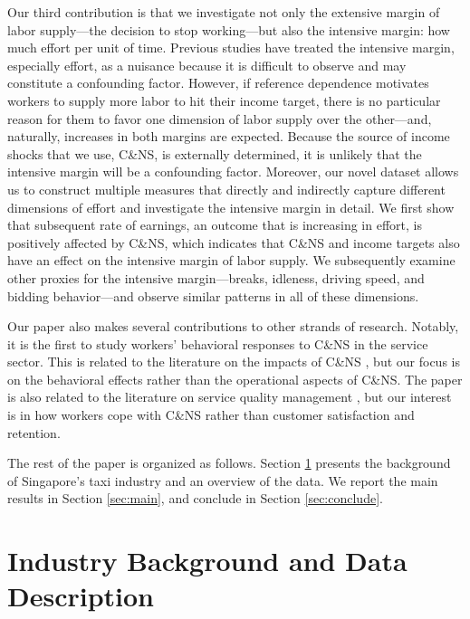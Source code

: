 \documentclass[reviewmode,AEJ]{AEA}
\begin{document}
Our third contribution is that we investigate not only the extensive margin of labor supply---the decision
to stop working---but also the intensive margin: %
how much effort per unit of time. 
Previous studies have treated the intensive margin, especially effort, as a nuisance because it is 
difficult to observe and may constitute a confounding factor. However, if reference dependence motivates
workers to supply more labor to hit their income target, there is no particular reason for them to favor
one dimension of labor supply over the other---and, naturally, increases in both margins are expected.
Because the source of income shocks that we use, C\&NS, is externally determined, it is unlikely that the 
intensive margin will be a confounding factor. Moreover, our novel dataset allows us to construct multiple
measures that directly and indirectly capture different dimensions of effort and investigate the intensive
margin in detail. We first show that subsequent rate of earnings, an outcome that is increasing in effort,
is positively affected by C\&NS, which indicates that C\&NS and income targets also have an effect on the
intensive margin of labor supply. We subsequently examine other proxies for the intensive margin---breaks,
idleness, driving speed, and bidding behavior---and observe similar patterns in all of these dimensions.

Our paper also makes several contributions to other strands of research. Notably, it is the first to study
workers' behavioral responses to C\&NS in the service sector. This is related to the literature on the
impacts of C\&NS \citep{moore2001time,patrick2008reducing,norris2014empirical,feldman2014appointment}, 
but our focus is on the behavioral effects rather than the operational aspects of C\&NS. 
The paper is also related to the literature on service quality management \citep{cohen2018frustration},
but our interest is in how workers cope with C\&NS rather than customer satisfaction and retention. 

The rest of the paper is organized as follows. 
Section \ref{sec:background} presents the background of Singapore's taxi industry and an overview of the data. 
We report the main results in Section \ref{sec:main}, and conclude in Section \ref{sec:conclude}.

\section{Industry Background and Data Description}
\label{sec:background}
\end{document}
